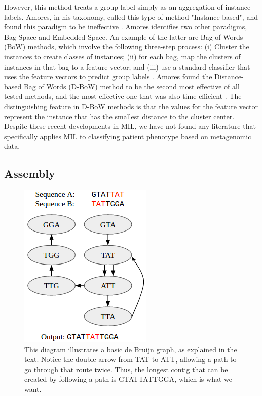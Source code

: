 However, this method treats a group label simply as an aggregation of instance labels. Amores, in his taxonomy, called this type of method "Instance-based", and found this paradigm to be ineffective \cite{amores13}. Amores identifies two other paradigms, Bag-Space and Embedded-Space. An example of the latter are Bag of Words (BoW) methods, which involve the following three-step process: (i) Cluster the instances to create classes of instances; (ii) for each bag, map the clusters of instances in that bag to a feature vector; and (iii) use a standard classifier that uses the feature vectors to predict group labels \cite{amores13}. Amores found the Distance-based Bag of Words (D-BoW) method to be the second most effective of all tested methods, and the most effective one that was also time-efficient \cite{amores13}. The distinguishing feature in D-BoW methods is that the values for the feature vector represent the instance that has the smallest distance to the cluster center. Despite these recent developments in MIL, we have not found any literature that specifically applies MIL to classifying patient phenotype based on metagenomic data.

\subsection{Assembly}

\begin{figure}[h]
\centering
\includegraphics[scale=0.5]{./de-bruijn.png}
\caption{This diagram illustrates a basic de Bruijn graph, as explained in the text. Notice the double arrow from TAT to ATT, allowing a path to go through that route twice. Thus, the longest contig that can be created by following a path is GTATTATTGGA, which is what we want.} \label{de-bruijn}
\end{figure}

